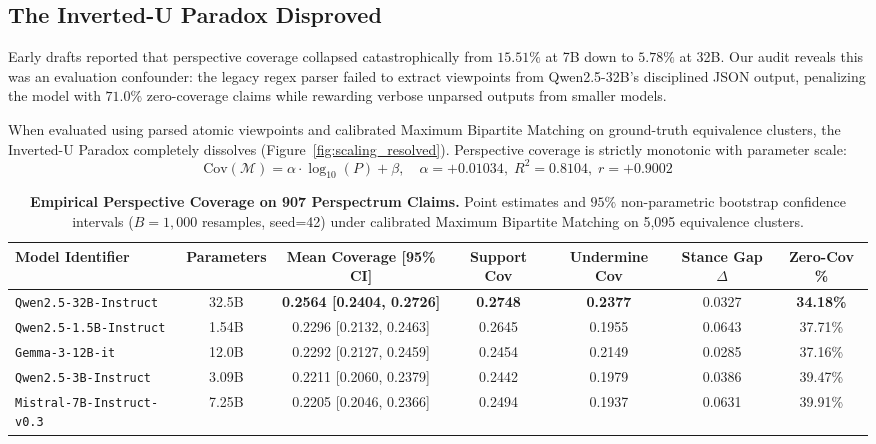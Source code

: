 \documentclass[11pt,a4paper]{article}
\begin{document}
\subsection{The Inverted-U Paradox Disproved}
Early drafts reported that perspective coverage collapsed catastrophically from $15.51\%$ at 7B down to $5.78\%$ at 32B. Our audit reveals this was an evaluation confounder: the legacy regex parser failed to extract viewpoints from Qwen2.5-32B's disciplined JSON output, penalizing the model with $71.0\%$ zero-coverage claims while rewarding verbose unparsed outputs from smaller models.

When evaluated using parsed atomic viewpoints and calibrated Maximum Bipartite Matching on ground-truth equivalence clusters, the Inverted-U Paradox completely dissolves (Figure~\ref{fig:scaling_resolved}). Perspective coverage is strictly monotonic with parameter scale:
\begin{equation}
    \text{Cov}(\mathcal{M}) = \alpha \cdot \log_{10}(P) + \beta, \quad \alpha = +0.01034, \; R^2 = 0.8104, \; r = +0.9002
\end{equation}

\begin{table}[t]
\centering
\small
\begin{tabular}{lcccccc}
\toprule
\textbf{Model Identifier} & \textbf{Parameters} & \textbf{Mean Coverage [95\% CI]} & \textbf{Support Cov} & \textbf{Undermine Cov} & \textbf{Stance Gap $\Delta$} & \textbf{Zero-Cov \%} \\
\midrule
\texttt{Qwen2.5-32B-Instruct} & 32.5B & \textbf{0.2564 [0.2404, 0.2726]} & \textbf{0.2748} & \textbf{0.2377} & 0.0327 & \textbf{34.18\%} \\
\texttt{Qwen2.5-1.5B-Instruct} & 1.54B & 0.2296 [0.2132, 0.2463] & 0.2645 & 0.1955 & 0.0643 & 37.71\% \\
\texttt{Gemma-3-12B-it} & 12.0B & 0.2292 [0.2127, 0.2459] & 0.2454 & 0.2149 & 0.0285 & 37.16\% \\
\texttt{Qwen2.5-3B-Instruct} & 3.09B & 0.2211 [0.2060, 0.2379] & 0.2442 & 0.1979 & 0.0386 & 39.47\% \\
\texttt{Mistral-7B-Instruct-v0.3} & 7.25B & 0.2205 [0.2046, 0.2366] & 0.2494 & 0.1937 & 0.0631 & 39.91\% \\
\bottomrule
\end{tabular}
\caption{\textbf{Empirical Perspective Coverage on 907 Perspectrum Claims.} Point estimates and $95\%$ non-parametric bootstrap confidence intervals ($B = 1,000$ resamples, seed=42) under calibrated Maximum Bipartite Matching on 5,095 equivalence clusters.}
\label{tab:bootstrap_ci}
\end{table}
\end{document}
